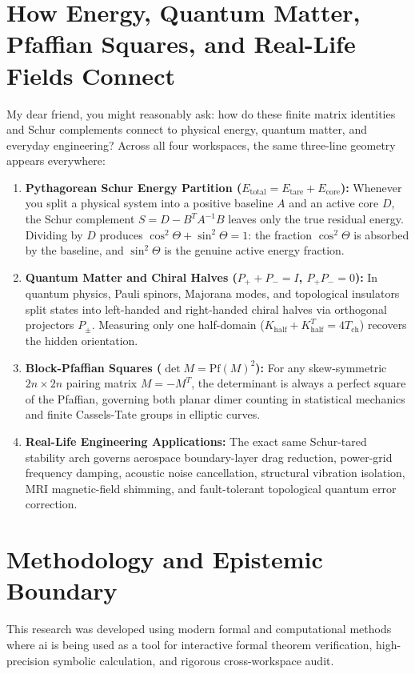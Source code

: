 \documentclass[11pt,a4paper]{article}
\theoremstyle{definition}
\begin{document}
\section{How Energy, Quantum Matter, Pfaffian Squares, and Real-Life Fields Connect}

My dear friend, you might reasonably ask: how do these finite matrix identities and Schur complements connect to physical energy, quantum matter, and everyday engineering? Across all four workspaces, the same three-line geometry appears everywhere:

\begin{enumerate}
  \item \textbf{Pythagorean Schur Energy Partition ($E_{\mathrm{total}} = E_{\mathrm{tare}} + E_{\mathrm{core}}$):} Whenever you split a physical system into a positive baseline $A$ and an active core $D$, the Schur complement $S = D - B^T A^{-1} B$ leaves only the true residual energy. Dividing by $D$ produces $\cos^2\Theta + \sin^2\Theta = 1$: the fraction $\cos^2\Theta$ is absorbed by the baseline, and $\sin^2\Theta$ is the genuine active energy fraction.
  \item \textbf{Quantum Matter and Chiral Halves ($P_+ + P_- = I$, $P_+ P_- = 0$):} In quantum physics, Pauli spinors, Majorana modes, and topological insulators split states into left-handed and right-handed chiral halves via orthogonal projectors $P_\pm$. Measuring only one half-domain ($K_{\mathrm{half}} + K_{\mathrm{half}}^T = 4 T_{\mathrm{ch}}$) recovers the hidden orientation.
  \item \textbf{Block-Pfaffian Squares ($\det M = \mathrm{Pf}(M)^2$):} For any skew-symmetric $2n \times 2n$ pairing matrix $M = -M^T$, the determinant is always a perfect square of the Pfaffian, governing both planar dimer counting in statistical mechanics and finite Cassels-Tate groups in elliptic curves.
  \item \textbf{Real-Life Engineering Applications:} The exact same Schur-tared stability arch governs aerospace boundary-layer drag reduction, power-grid frequency damping, acoustic noise cancellation, structural vibration isolation, MRI magnetic-field shimming, and fault-tolerant topological quantum error correction.
\end{enumerate}

\section{Methodology and Epistemic Boundary}
\noindent This research was developed using modern formal and computational methods where ai is being used as a tool for interactive formal theorem verification, high-precision symbolic calculation, and rigorous cross-workspace audit.
\end{document}
